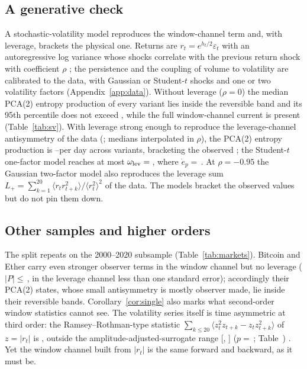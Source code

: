 \subsection{A generative check}\label{sec:sv}

A stochastic-volatility model reproduces the window-channel term and, with leverage, brackets the physical one. Returns are $r_t=e^{h_t/2}\varepsilon_t$ with an autoregressive log variance whose shocks correlate with the previous return shock with coefficient $\rho$ \cite{harvey1996}; the persistence and the coupling of volume to volatility are calibrated to the data, with Gaussian or Student-$t$ shocks and one or two volatility factors (Appendix~\ref{app:data}). Without leverage ($\rho=0$) the median PCA(2) entropy production of every variant lies inside the reversible band and its 95th percentile does not exceed \SVQnfMax, while the full window-channel current is present (Table~\ref{tab:sv}). With leverage strong enough to reproduce the leverage-channel antisymmetry of the data (\OmLevData; medians interpolated in $\rho$), the PCA(2) entropy production is \SVMatchLo--\SVMatchHi per day across variants, bracketing the observed ; the Student-$t$ one-factor model reaches at most $\omega_{\rm lev}=\,$\TOneLevMax, where $\dot e_p=\,$\TOneEpAtMax. At $\rho=-0.95$ the Gaussian two-factor model also reproduces the leverage sum $L_+=\sum_{k=1}^{20}\langle r_tr_{t+k}^2\rangle/\langle r_t^2\rangle^2$ of the data. The models bracket the observed values but do not pin them down.

\begin{table}[t]
\caption{Stochastic-volatility null for the PCA(2) state: median entropy production per day, leverage-channel antisymmetry and leverage sum $L_+$ for 30 replicates per leverage coefficient $\rho$, for the simplest and the richest variant (all four in Table~).}
\label{tab:sv}

\end{table}

\subsection{Other samples and higher orders}\label{sec:robust}

The split repeats on the 2000--2020 subsample (Table~\ref{tab:markets}). Bitcoin and Ether carry even stronger observer terms in the window channel but no leverage ($|P|\le\,$\CryptoPmax, in the leverage channel less than one standard error); accordingly their PCA(2) states, whose small antisymmetry is mostly observer made, lie inside their reversible bands. Corollary~\ref{cor:single} also marks what second-order window statistics cannot see. The volatility series itself is time asymmetric at third order: the Ramsey--Rothman-type statistic $\sum_{k\le20}\langle z_t^2z_{t+k}-z_tz_{t+k}^2\rangle$ of $z=|r_t|$ is \RRobs, outside the amplitude-adjusted-surrogate range [\RRlo, \RRhi] ($p=\,$\RRp; Table~) \cite{ramsey1996}. Yet the window channel built from $|r_t|$ is the same forward and backward, as it must be.

